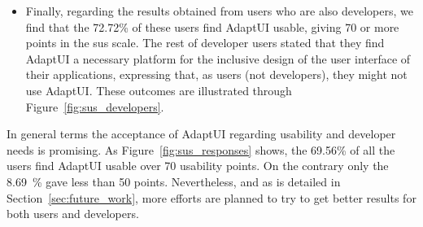 \begin{itemize}
  \item Finally, regarding the results obtained from users who are also 
  developers, we find that the 72.72\% of these users find AdaptUI usable, 
  giving 70 or more points in the \ac{sus} scale. The rest of developer users 
  stated that they find AdaptUI a necessary platform for the inclusive design of 
  the user interface of their applications, expressing that, as users (not 
  developers), they might not use AdaptUI. These outcomes are illustrated
  through Figure~\ref{fig:sus_developers}.
\end{itemize}

In general terms the acceptance of AdaptUI regarding usability and developer
needs is promising. As Figure~\ref{fig:sus_responses} shows, the 69.56\% of all 
the users find AdaptUI usable over 70 usability points. On the contrary only
the 8.69~\% gave less than 50 points. Nevertheless, and as is detailed in 
Section~\ref{sec:future_work}, more efforts are planned to try to get better
results for both users and developers.